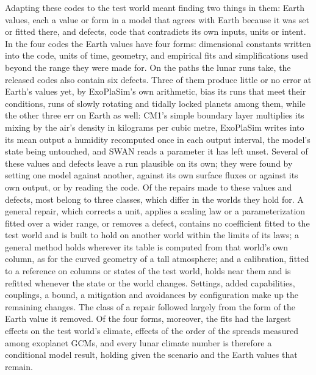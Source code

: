Adapting these codes to the test world meant finding two things in them: Earth values, each a value or form in
a model that agrees with Earth because it was set or fitted there, and defects, code that contradicts its own
inputs, units or intent. In the four codes the Earth values have four forms: dimensional constants written into
the code, units of time, geometry, and empirical fits and simplifications used beyond the range they were made
for. On the paths the lunar runs take, the released codes also contain six defects. Three of them produce
little or no error at Earth's values yet, by ExoPlaSim's own arithmetic, bias its runs that meet their
conditions, runs of slowly rotating and tidally locked planets among them, while the other three err on Earth as well:
CM1's simple boundary layer multiplies its mixing by the air's density in kilograms per cubic metre, ExoPlaSim
writes into its mean output a humidity recomputed once in each output interval, the model's state being untouched,
and SWAN reads a parameter it has left unset. Several of these values and defects leave a run plausible on its own; they
were found by setting one model against another, against its own surface fluxes or against its own output, or by
reading the code. Of the repairs made to these values
and defects, most belong to three classes, which differ in the worlds they hold for. A general repair, which
corrects a unit, applies a scaling law or a parameterization fitted over a wider range, or removes a defect,
contains no coefficient fitted to the test world and is built to hold on another world within the limits of its
laws; a general method holds wherever its table is computed from that world's own column, as for the curved
geometry of a tall atmosphere; and a calibration, fitted to a reference on columns or states of the test world, holds near them and is refitted
whenever the state or the world changes. Settings, added capabilities, couplings, a
bound, a mitigation and avoidances by configuration make up the remaining changes. The class of a repair followed
largely from the form of the Earth value it removed. Of the four forms, moreover, the fits had the largest effects on the test world's climate, effects of the order of the spreads measured among exoplanet GCMs, and every lunar climate number is therefore a conditional model result, holding given the
scenario and the Earth values that remain.

